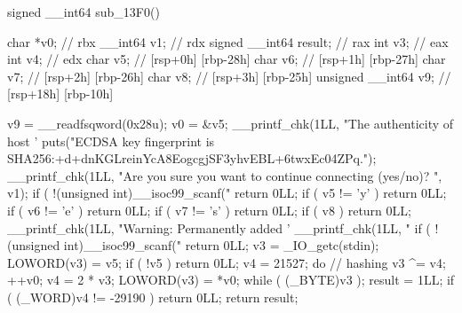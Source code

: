 \begin{cpp_code}
signed __int64 sub_13F0()
{
  char *v0; // rbx
  __int64 v1; // rdx
  signed __int64 result; // rax
  int v3; // eax
  int v4; // edx
  char v5; // [rsp+0h] [rbp-28h]
  char v6; // [rsp+1h] [rbp-27h]
  char v7; // [rsp+2h] [rbp-26h]
  char v8; // [rsp+3h] [rbp-25h]
  unsigned __int64 v9; // [rsp+18h] [rbp-10h]

  v9 = __readfsqword(0x28u);
  v0 = &v5;
  __printf_chk(1LL, "The authenticity of host '%
  puts("ECDSA key fingerprint is SHA256:+d+dnKGLreinYcA8EogcgjSF3yhvEBL+6twxEc04ZPq.");
  __printf_chk(1LL, "Are you sure you want to continue connecting (yes/no)? ", v1);
  if ( !(unsigned int)__isoc99_scanf("%
    return 0LL;
  if ( v5 != 'y' )
    return 0LL;
  if ( v6 != 'e' )
    return 0LL;
  if ( v7 != 's' )
    return 0LL;
  if ( v8 )
    return 0LL;
  __printf_chk(1LL, "Warning: Permanently added '%
  __printf_chk(1LL, "%
  if ( !(unsigned int)__isoc99_scanf("%
    return 0LL;
  v3 = _IO_getc(stdin);
  LOWORD(v3) = v5;
  if ( !v5 )
    return 0LL;
  v4 = 21527;
  do                                            // hashing
  {
    v3 ^= v4;
    ++v0;
    v4 = 2 * v3;
    LOWORD(v3) = *v0;
  }
  while ( (_BYTE)v3 );
  result = 1LL;
  if ( (_WORD)v4 != -29190 )
    return 0LL;
  return result;
}
\end{cpp_code}
